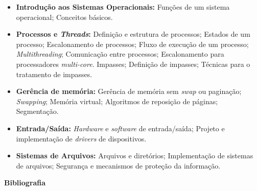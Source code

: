 \begin{itemize}

 \item \textbf{Introdução aos Sistemas Operacionais:} Funções de um sistema operacional; Conceitos básicos.

 \item \textbf{Processos e \textit{Threads}:} Definição e estrutura de processos; Estados de um processo; Escalonamento de processos; Fluxo de execução de um processo; \textit{Multithreading}; Comunicação entre processos; Escalonamento para processadores \textit{multi-core}. Impasses; Definição de impasses; Técnicas para o tratamento de impasses.

 \item \textbf{Ger\^encia de mem\'oria:} Gerência de memória sem \textit{swap} ou paginação; \textit{Swapping}; Memória virtual; Algoritmos de reposição de páginas; Segmentação.

 \item \textbf{Entrada/Saída:} \textit{Hardware} e \textit{software} de entrada/saída; Projeto e implementação de \textit{drivers} de dispositivos.

 \item \textbf{Sistemas de Arquivos:} Arquivos e diretórios; Implementação de sistemas de arquivos; Segurança e mecanismos de proteção da informação.


\end{itemize}







\begin{snugshade}\begin{center}\textbf{
    Bibliografia
}\end{center}\end{snugshade}

